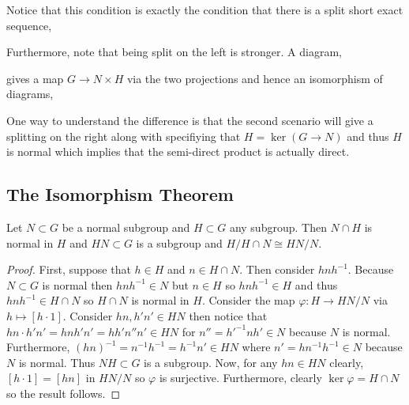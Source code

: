 \documentclass[12pt]{article}
\begin{document}
\begin{rmk}
Notice that this condition is exactly the condition that there is a split short exact sequence,
\begin{center}
\end{center}
Furthermore, note that being split on the left is stronger. A diagram,
\begin{center}
\end{center}
gives a map $G \to N \times H$ via the two projections and hence an isomorphism of diagrams,
\begin{center}
\end{center}
One way to understand the difference is that the second scenario will give a splitting on the right along with specifiying that $H = \ker{(G \to N)}$ and thus $H$ is normal which implies that the semi-direct product is actually direct.  
\end{rmk}


\subsection{The Isomorphism Theorem}

\begin{thm}
Let $N \subset G$ be a normal subgroup and $H \subset G$ any subgroup. Then $N \cap H$ is normal in $H$ and $HN \subset G$ is a subgroup and $H/H \cap N \cong HN/N$.
\end{thm}

\begin{proof}
First, suppose that $h \in H$ and $n \in H \cap N$. Then consider $h n h^{-1}$. Because $N \subset G$ is normal then $h n h^{-1} \in N$ but $n \in H$ so $h n h^{-1} \in H$ and thus $h n h^{-1} \in H \cap N$ so $H \cap N$ is normal in $H$. 
Consider the map $\varphi : H \to HN / N$ via $h \mapsto [h \cdot 1]$. Consider $hn, h'n' \in HN$ then notice that $hn \cdot h'n' = h n h' n' = h h' n'' n' \in HN$ for $n'' = h'^{-1} n h' \in N$ because $N$ is normal. Furthermore, $(h n)^{-1} = n^{-1} h^{-1} = h^{-1} n' \in HN$ where $n' = h n^{-1} h^{-1} \in N$ because $N$ is normal. Thus $NH \subset G$ is a subgroup. Now, for any $hn \in HN$ clearly, $[h \cdot 1] = [hn]$ in $HN / N$ so $\varphi$ is surjective. Furthermore, clearly $\ker{\varphi} = H \cap N$ so the result follows.
\end{proof}
\end{document}
